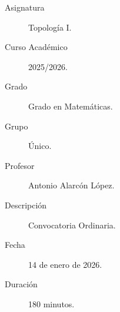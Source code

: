 \documentclass[12pt]{article}
\begin{document}

    
    

    \begin{description}
        \item[Asignatura] Topología I.
        \item[Curso Académico] 2025/2026.
        \item[Grado] Grado en Matemáticas.
        \item[Grupo] Único.
        \item[Profesor] Antonio Alarcón López.
        \item[Descripción] Convocatoria Ordinaria.
        \item[Fecha] 14 de enero de 2026.
        \item[Duración] 180 minutos.
    
    \end{description}
    \newpage


    
\end{document}
